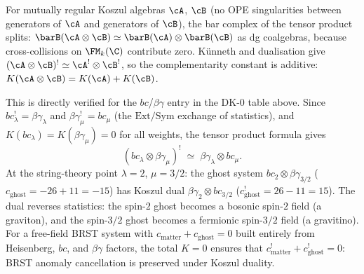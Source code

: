 \begin{remark}
\label{rem:koszul-tensor-string}
%
%
For mutually regular Koszul algebras $\cA$, $\cB$ (no OPE
singularities between generators of $\cA$ and generators
of $\cB$), the bar complex of the tensor product splits:
$\barB(\cA \otimes \cB) \simeq \barB(\cA) \otimes \barB(\cB)$
as dg coalgebras, because cross-collisions on $\FM_k(\C)$
contribute zero. K\"unneth and dualisation give
$(\cA \otimes \cB)^! \simeq \cA^! \otimes \cB^!$,
so the complementarity constant is additive:
$K(\cA \otimes \cB) = K(\cA) + K(\cB)$.

This is directly verified for the $bc$/$\beta\gamma$
entry in the DK-0 table above. Since
$bc_\lambda^! = \beta\gamma_\lambda$ and
$\beta\gamma_\mu^! = bc_\mu$ (the
$\mathrm{Ext}/\mathrm{Sym}$ exchange of statistics), and
$K(bc_\lambda) = K(\beta\gamma_\mu) = 0$ for all weights, the
tensor product formula gives
\[
(bc_\lambda \otimes \beta\gamma_\mu)^!
\;\simeq\;
\beta\gamma_\lambda \otimes bc_\mu.
\]
At the string-theory point $\lambda = 2$, $\mu = 3/2$: the
ghost system $bc_2 \otimes \beta\gamma_{3/2}$ ($c_{\mathrm{ghost}}
= -26 + 11 = -15$) has Koszul dual
$\beta\gamma_2 \otimes bc_{3/2}$ ($c_{\mathrm{ghost}}^! = 26 - 11
= 15$). The dual reverses statistics: the spin-$2$ ghost becomes
a bosonic spin-$2$ field (a graviton), and the spin-$3/2$ ghost
becomes a fermionic spin-$3/2$ field (a gravitino). For a
free-field BRST system with $c_{\mathrm{matter}} +
c_{\mathrm{ghost}} = 0$ built entirely from Heisenberg, $bc$, and
$\beta\gamma$ factors, the total $K = 0$ ensures that
$c_{\mathrm{matter}}^! + c_{\mathrm{ghost}}^! = 0$: BRST anomaly
cancellation is preserved under Koszul duality.
\end{remark}

